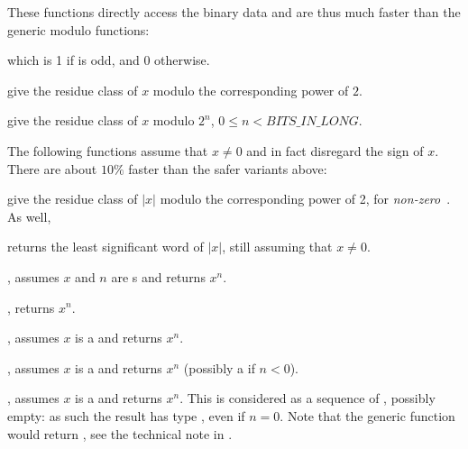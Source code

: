 These functions directly access the binary data and are thus much faster than
the generic modulo functions:

 which is 1 if  is odd, and 0 otherwise.






 give the residue class of $x$ modulo the
corresponding power of $2$.

 give the residue class of $x$ modulo
$2^n$, $0 \leq n < BITS\_IN\_LONG$.

The following functions assume that $x\neq 0$ and in fact disregard the
sign of $x$. There are about $10\%$ faster than the safer variants above:






 give the residue class of $|x|$ modulo the
corresponding power of 2, for \emph{non-zero}~. As well,

 returns the least significant word of $|x|$, still
assuming that $x\neq 0$.


, assumes $x$ and $n$ are s and
returns $x^n$.

, returns $x^n$.

, assumes $x$ is a  and returns $x^n$.

, assumes $x$ is a  and returns $x^n$
(possibly a  if $n < 0$).

, assumes $x$ is a  and returns
$x^n$. This is considered as a sequence of , possibly empty:
as such the result has type , even if $n = 0$.
Note that the generic function  would return ,
see the technical note in .

